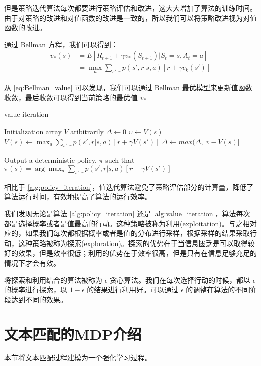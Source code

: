 但是策略迭代算法每次都要进行策略评估和改进，这大大增加了算法的训练时间。由于对策略的改进和对值函数的改进是一致的，所以我们可以将策略改进视为对值函数的改进。

通过 Bellman 方程，我们可以得到：
\begin{equation}\label{eq:Bellman_value}
\begin{aligned}
v_{*}(s) & = E[R_{t+1} + \gamma v_*(S_{t+1})|S_t=s, A_t=a]\\
         & = \max_a \sum_{s',r}p(s', r| s, a)[r+\gamma v_k(s')]
\end{aligned}
\end{equation}

从 \eqref{eq:Bellman_value} 可以发现，我们可以通过 Bellman 最优模型来更新值函数收敛，最后收敛可以得到当前策略的最优值 $v_*$

\begin{algorithm}[!htbp]
    \small
    \caption{value iteration}\label{alg:value_iteration}
    \begin{algorithmic}
        \State Initialization array $V$ aribitrarily
        \Repeat
        \State $\Delta \leftarrow 0$
        \State $v \leftarrow V(s)$
        \State $V(s)\leftarrow \max_a\sum_{s', r} p(s', r|s, a)[r + \gamma V(s')]$
        \State $\Delta \leftarrow max(\Delta, |v-V(s)|$
        \EndFor
        \Until{$\Delta < \theta$}

        \State Output a deterministic policy, $\pi$ such that
        \State $\pi(s) = \arg\max_a\sum_{s', r} p(s', r|s, a)[r + \gamma V(s')]$
    \end{algorithmic}
\end{algorithm}

相比于 \ref{alg:policy_iteration}，值迭代算法避免了策略评估部分的计算量，降低了算法运行时间，有效地提高了算法的运行效率。

我们发现无论是算法 \ref{alg:policy_iteration} 还是 \ref{alg:value_iteration}，算法每次都是选择概率或者是值最高的行动。这种策略被称为利用(exploitation)。与之相对应的，如果我们每次都根据概率或者是值的分布进行采样，根据采样的结果采取行动，这种策略被称为探索(exploration)。探索的优势在于当信息匮乏是可以取得较好的效果，但是效率很低；利用的优势在于效率很高，但是只有在信息足够充足的情况下才会有效。

将探索和利用结合的算法被称为 $\epsilon$-贪心算法。我们在每次选择行动的时候，都以 $\epsilon$ 的概率进行探索，以 $1-\epsilon$ 的结果进行利用好。可以通过 $\epsilon$ 的调整在算法的不同阶段达到不同的效果。

\section{文本匹配的MDP介绍}
\label{sec:TM_MDP}
本节将文本匹配过程建模为一个强化学习过程。

